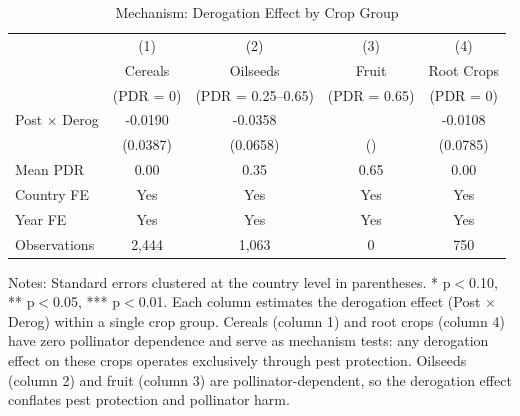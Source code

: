 \begin{table}[H]
\centering
\caption{Mechanism: Derogation Effect by Crop Group}
\label{tab:mechanism}
\begin{threeparttable}
\begin{tabular}{lcccc}
\toprule
 & (1) & (2) & (3) & (4) \\
 & Cereals & Oilseeds & Fruit & Root Crops \\
 & (PDR = 0) & (PDR = 0.25--0.65) & (PDR = 0.65) & (PDR = 0) \\
\midrule
Post $\times$ Derog & -0.0190 & -0.0358 &  & -0.0108 \\
 & (0.0387) & (0.0658) & () & (0.0785) \\
\midrule
Mean PDR & 0.00 & 0.35 & 0.65 & 0.00 \\
Country FE & Yes & Yes & Yes & Yes \\
Year FE & Yes & Yes & Yes & Yes \\
Observations & 2,444 & 1,063 & 0 & 750 \\
\bottomrule
\end{tabular}
\begin{tablenotes}[flushleft]
\small
\item Notes: Standard errors clustered at the country level in parentheses. * p$<$0.10, ** p$<$0.05, *** p$<$0.01. Each column estimates the derogation effect (Post $\times$ Derog) within a single crop group. Cereals (column 1) and root crops (column 4) have zero pollinator dependence and serve as mechanism tests: any derogation effect on these crops operates exclusively through pest protection. Oilseeds (column 2) and fruit (column 3) are pollinator-dependent, so the derogation effect conflates pest protection and pollinator harm.
\end{tablenotes}
\end{threeparttable}
\end{table}
